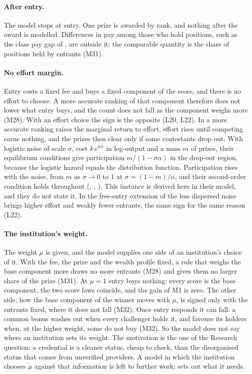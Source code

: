 \paragraph{After entry.} The model stops at entry. One prize is awarded by
rank, and nothing after the award is modelled. Differences in pay among those
who hold positions, such as the class pay gap of \citet{LaurisonFriedman2016},
are outside it; the comparable quantity is the share of positions held by
entrants (M31).

\paragraph{No effort margin.} Entry costs a fixed fee and buys a fixed
component of the score, and there is no effort to choose. A more accurate
ranking of that component therefore does not lower what entry buys, and the
count does not fall as the component weighs more (M28). With an effort choice
the sign is the opposite (L20, L22). In \citet{MorganTumlinsonVardy2022} a more
accurate ranking raises the marginal return to effort, effort rises until
competing earns nothing, and the prizes then clear only if some contestants
drop out. With logistic noise of scale $\sigma$, cost $k\,e^{\alpha x}$ in
log-output and a mass $m$ of prizes, their equilibrium conditions give
participation $m/(1-\sigma\alpha)$ in the drop-out region, because the
logistic hazard equals the distribution function. Participation rises with
the noise, from $m$ as $\sigma\to0$ to $1$ at $\sigma=(1-m)/\alpha$, and their
second-order condition holds throughout
(,
,
). This instance is derived here in their
model, and they do not state it. In the free-entry extension of
\citet{DrugovRyvkin2020a} the less dispersed noise brings higher effort and
weakly fewer entrants, the same sign for the same reason (L22).

\paragraph{The institution's weight.} The weight $\mu$ is given, and the
model supplies one side of an institution's choice of it. With the fee, the
prize and the wealth profile fixed, a rule that weighs the base component more
draws no more entrants (M28) and gives them no larger share of the prize (M31).
At $\mu=1$ entry buys nothing: every score is the base component, the two score
laws coincide, and the gain of M1 is zero. The other side, how the base
component of the winner moves with $\mu$, is signed only with the entrants
fixed, where it does not fall (M32). Once entry responds it can fall: a common
bonus washes out when every challenger holds it, and favours its holders when, at the higher weight, some do not buy (M32). So the model does not say where an institution sets its
weight. The motivation is the one of the
Research question: a credential is a cleaner status, cheap to check, than the
disorganised status that comes from unverified providers. A
model in which the institution chooses $\mu$ against that information is left
to further work;  sets out what it needs.

